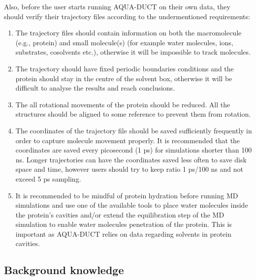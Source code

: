 \documentclass[9pt,tutorial]{livecoms}
\begin{document}
Also, before the user starts running AQUA-DUCT on their own data, they should verify their trajectory files according to the undermentioned requirements:
\begin{enumerate}
\item The trajectory files should contain information on both the macromolecule (e.g., protein) and small molecule(s) (for example water molecules, ions, substrates, cosolvents etc.), otherwise it will be impossible to track molecules.
\item The trajectory should have fixed periodic boundaries conditions and the protein should stay in the centre of the solvent box, otherwise it will be difficult to analyse the results and reach conclusions.
\item The all rotational movements of the protein should be reduced. All the structures should be aligned to some reference to prevent them from rotation.
\item The coordinates of the trajectory file should be saved sufficiently frequently in order to capture molecule movement properly. It is recommended that the coordinates are saved every picosecond (1 ps) for simulations shorter than 100 ns. Longer trajectories can have the coordinates saved less often to save disk space and time, however users should try to keep ratio 1 ps/100 ns and not exceed 5 ps sampling.
\item It is recommended to be mindful of protein hydration before running MD simulations and use one of the available tools \cite{Mitusinska2020} to place water molecules inside the protein’s cavities and/or extend the equilibration step of the MD simulation to enable water molecules penetration of the protein. This is important as AQUA-DUCT relies on data regarding solvents in protein cavities. 
\end{enumerate}

\subsection{Background knowledge}
\end{document}
